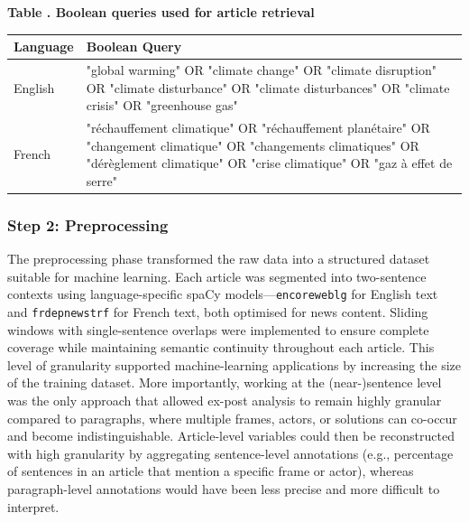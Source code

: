 \documentclass[12pt]{article}
\renewcommand\_{\texttt{\detokenize{_}\allowbreak}}
\begin{document}
\begin{center}
\begingroup
{}\label{tab:boolean_queries}
\begin{minipage}{0.95\linewidth}
\centering
\setlength{\tabcolsep}{8pt}
\renewcommand{\arraystretch}{1.25}
\textbf{Table \thetable. Boolean queries used for article retrieval}
\vspace{0.5em}

{\fontsize{10}{12}\selectfont
\begin{tabular}{>{\raggedright\arraybackslash}p{2.8cm} >{\raggedright\arraybackslash}p{12cm}}
\toprule
\textbf{Language} & \textbf{Boolean Query} \\
\midrule
English & "global warming" OR "climate change" OR "climate disruption" OR "climate disturbance" OR "climate disturbances" OR "climate crisis" OR "greenhouse gas" \\
French & "réchauffement climatique" OR "réchauffement planétaire" OR "changement climatique" OR "changements climatiques" OR "dérèglement climatique" OR "crise climatique" OR "gaz à effet de serre" \\
\bottomrule
\end{tabular}
}
\end{minipage}
\endgroup
\end{center}

\subsubsection{Step 2: Preprocessing}
\label{subsec:step2_preprocessing}

The preprocessing phase transformed the raw data into a structured dataset suitable for machine learning. Each article was segmented into two-sentence contexts using language-specific spaCy models---\texttt{en\_core\_web\_lg} for English text and \texttt{fr\_dep\_news\_trf} for French text, both optimised for news content. Sliding windows with single-sentence overlaps were implemented to ensure complete coverage while maintaining semantic continuity throughout each article. This level of granularity supported machine-learning applications by increasing the size of the training dataset. More importantly, working at the (near-)sentence level was the only approach that allowed ex-post analysis to remain highly granular compared to paragraphs, where multiple frames, actors, or solutions can co-occur and become indistinguishable. Article-level variables could then be reconstructed with high granularity by aggregating sentence-level annotations (e.g., percentage of sentences in an article that mention a specific frame or actor), whereas paragraph-level annotations would have been less precise and more difficult to interpret.
\end{document}
